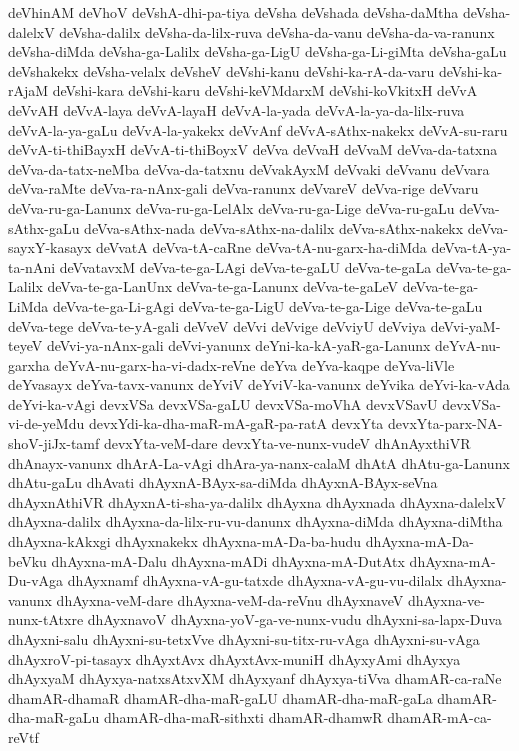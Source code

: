 {deVhinAM
deVhoV
deVshA-dhi-pa-tiya
deVsha
deVshada
deVsha-daMtha
deVsha-dalelxV
deVsha-dalilx
deVsha-da-lilx-ruva
deVsha-da-vanu
deVsha-da-va-ranunx
deVsha-diMda
deVsha-ga-Lalilx
deVsha-ga-LigU
deVsha-ga-Li-giMta
deVsha-gaLu
deVshakekx
deVsha-velalx
deVsheV
deVshi-kanu
deVshi-ka-rA-da-varu
deVshi-ka-rAjaM
deVshi-kara
deVshi-karu
deVshi-keVMdarxM
deVshi-koVkitxH
deVvA
deVvAH
deVvA-laya
deVvA-layaH
deVvA-la-yada
deVvA-la-ya-da-lilx-ruva
deVvA-la-ya-gaLu
deVvA-la-yakekx
deVvAnf
deVvA-sAthx-nakekx
deVvA-su-raru
deVvA-ti-thiBayxH
deVvA-ti-thiBoyxV
deVva
deVvaH
deVvaM
deVva-da-tatxna
deVva-da-tatx-neMba
deVva-da-tatxnu
deVvakAyxM
deVvaki
deVvanu
deVvara
deVva-raMte
deVva-ra-nAnx-gali
deVva-ranunx
deVvareV
deVva-rige
deVvaru
deVva-ru-ga-Lanunx
deVva-ru-ga-LelAlx
deVva-ru-ga-Lige
deVva-ru-gaLu
deVva-sAthx-gaLu
deVva-sAthx-nada
deVva-sAthx-na-dalilx
deVva-sAthx-nakekx
deVva-sayxY-kasayx
deVvatA
deVva-tA-caRne
deVva-tA-nu-garx-ha-diMda
deVva-tA-ya-ta-nAni
deVvatavxM
deVva-te-ga-LAgi
deVva-te-gaLU
deVva-te-gaLa
deVva-te-ga-Lalilx
deVva-te-ga-LanUnx
deVva-te-ga-Lanunx
deVva-te-gaLeV
deVva-te-ga-LiMda
deVva-te-ga-Li-gAgi
deVva-te-ga-LigU
deVva-te-ga-Lige
deVva-te-gaLu
deVva-tege
deVva-te-yA-gali
deVveV
deVvi
deVvige
deVviyU
deVviya
deVvi-yaM-teyeV
deVvi-ya-nAnx-gali
deVvi-yanunx
deYni-ka-kA-yaR-ga-Lanunx
deYvA-nu-garxha
deYvA-nu-garx-ha-vi-dadx-reVne
deYva
deYva-kaqpe
deYva-liVle
deYvasayx
deYva-tavx-vanunx
deYviV
deYviV-ka-vanunx
deYvika
deYvi-ka-vAda
deYvi-ka-vAgi
devxVSa
devxVSa-gaLU
devxVSa-moVhA
devxVSavU
devxVSa-vi-de-yeMdu
devxYdi-ka-dha-maR-mA-gaR-pa-ratA
devxYta
devxYta-parx-NA-shoV-jiJx-tamf
devxYta-veM-dare
devxYta-ve-nunx-vudeV
dhAnAyxthiVR
dhAnayx-vanunx
dhArA-La-vAgi
dhAra-ya-nanx-calaM
dhAtA
dhAtu-ga-Lanunx
dhAtu-gaLu
dhAvati
dhAyxnA-BAyx-sa-diMda
dhAyxnA-BAyx-seVna
dhAyxnAthiVR
dhAyxnA-ti-sha-ya-dalilx
dhAyxna
dhAyxnada
dhAyxna-dalelxV
dhAyxna-dalilx
dhAyxna-da-lilx-ru-vu-danunx
dhAyxna-diMda
dhAyxna-diMtha
dhAyxna-kAkxgi
dhAyxnakekx
dhAyxna-mA-Da-ba-hudu
dhAyxna-mA-Da-beVku
dhAyxna-mA-Dalu
dhAyxna-mADi
dhAyxna-mA-DutAtx
dhAyxna-mA-Du-vAga
dhAyxnamf
dhAyxna-vA-gu-tatxde
dhAyxna-vA-gu-vu-dilalx
dhAyxna-vanunx
dhAyxna-veM-dare
dhAyxna-veM-da-reVnu
dhAyxnaveV
dhAyxna-ve-nunx-tAtxre
dhAyxnavoV
dhAyxna-yoV-ga-ve-nunx-vudu
dhAyxni-sa-lapx-Duva
dhAyxni-salu
dhAyxni-su-tetxVve
dhAyxni-su-titx-ru-vAga
dhAyxni-su-vAga
dhAyxroV-pi-tasayx
dhAyxtAvx
dhAyxtAvx-muniH
dhAyxyAmi
dhAyxya
dhAyxyaM
dhAyxya-natxsAtxvXM
dhAyxyanf
dhAyxya-tiVva
dhamAR-ca-raNe
dhamAR-dhamaR
dhamAR-dha-maR-gaLU
dhamAR-dha-maR-gaLa
dhamAR-dha-maR-gaLu
dhamAR-dha-maR-sithxti
dhamAR-dhamwR
dhamAR-mA-ca-reVtf
}
